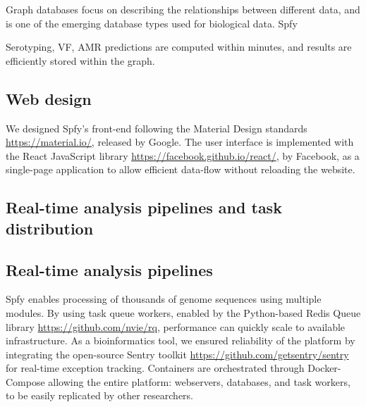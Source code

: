 \documentclass[a4,center,fleqn]{NAR}
\begin{document}
Graph databases focus on describing the relationships between different data, and is one of the emerging \cite{de2015trends} database types used for biological data.
Spfy 


Serotyping, VF, AMR predictions are computed within minutes, and results are efficiently stored within the graph.

\subsection{Web design}

We designed Spfy's front-end following the Material Design standards \url{https://material.io/}, released by Google.
The user interface is implemented with the React JavaScript library \url{https://facebook.github.io/react/}, by Facebook, as a single-page application to allow efficient data-flow without reloading the website.

\subsection{Real-time analysis pipelines and task distribution}
\subsection{Real-time analysis pipelines}

Spfy enables processing of thousands of genome sequences using multiple modules.
By using task queue workers, enabled by the Python-based Redis Queue library \url{https://github.com/nvie/rq}, performance can quickly scale to available infrastructure.
As a bioinformatics tool, we ensured reliability of the platform by integrating the open-source Sentry toolkit \url{https://github.com/getsentry/sentry} for real-time exception tracking.
Containers are orchestrated through Docker-Compose allowing the entire platform: webservers, databases, and task workers, to be easily replicated by other researchers.
\end{document}

